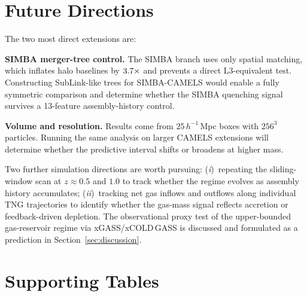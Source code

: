 \documentclass[twocolumn,linenumbers]{aastex701}
\begin{document}
\section{\textbf{Future Directions}}
\label{app:future}

The two most direct extensions are:

\textbf{SIMBA merger-tree control.}  The SIMBA branch uses only spatial
matching, which inflates halo baselines by $3.7\times$ and
prevents a direct L3-equivalent test.
Constructing SubLink-like trees for SIMBA-CAMELS would enable a fully
symmetric comparison and determine whether the SIMBA quenching signal
survives a 13-feature assembly-history control.

\textbf{Volume and resolution.}  Results come from $25\,h^{-1}$\,Mpc boxes
with $256^3$ particles.  Running the same analysis on larger CAMELS
extensions will determine whether the predictive interval shifts or broadens
at higher mass.

Two further simulation directions are worth pursuing: (\textit{i})~repeating
the sliding-window scan at $z \approx 0.5$ and $1.0$ to track whether the
regime evolves as assembly history accumulates; (\textit{ii})~tracking net
gas inflows and outflows along individual TNG trajectories to identify
whether the gas-mass signal reflects accretion or feedback-driven depletion.
The observational proxy test of the upper-bounded gas-reservoir regime via xGASS/xCOLD\,GASS
\citep{catinella2018,saintonge2017} is discussed and formulated as a prediction in
Section~\ref{sec:discussion}.

\section{\textbf{Supporting Tables}}
\label{app:tables}
\end{document}
